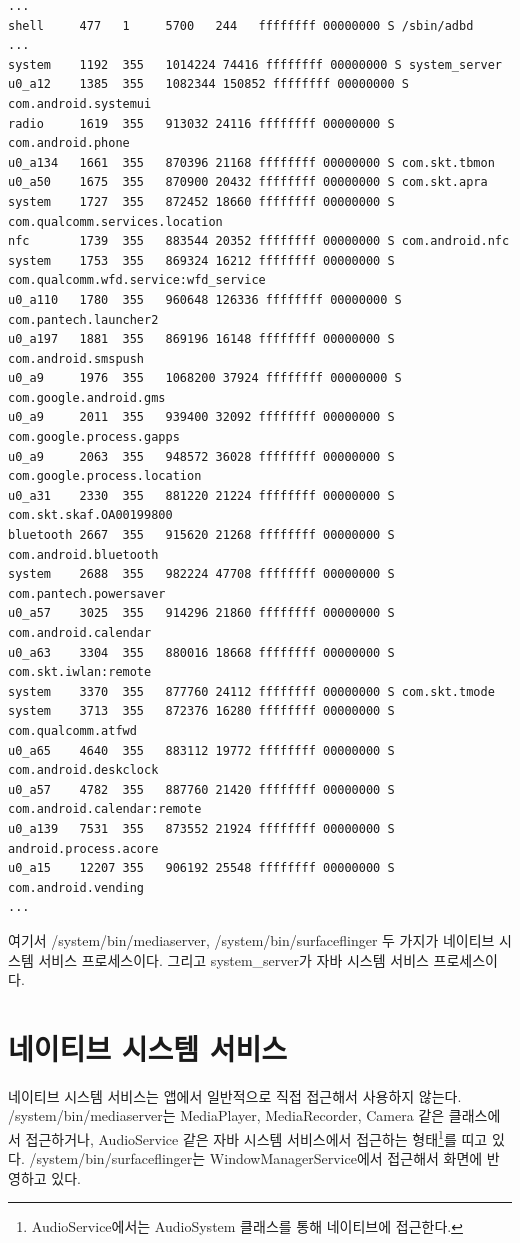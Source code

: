 \begin{lstlisting}[frame=single]
...
shell     477   1     5700   244   ffffffff 00000000 S /sbin/adbd
...
system    1192  355   1014224 74416 ffffffff 00000000 S system_server
u0_a12    1385  355   1082344 150852 ffffffff 00000000 S com.android.systemui
radio     1619  355   913032 24116 ffffffff 00000000 S com.android.phone
u0_a134   1661  355   870396 21168 ffffffff 00000000 S com.skt.tbmon
u0_a50    1675  355   870900 20432 ffffffff 00000000 S com.skt.apra
system    1727  355   872452 18660 ffffffff 00000000 S com.qualcomm.services.location
nfc       1739  355   883544 20352 ffffffff 00000000 S com.android.nfc
system    1753  355   869324 16212 ffffffff 00000000 S com.qualcomm.wfd.service:wfd_service
u0_a110   1780  355   960648 126336 ffffffff 00000000 S com.pantech.launcher2
u0_a197   1881  355   869196 16148 ffffffff 00000000 S com.android.smspush
u0_a9     1976  355   1068200 37924 ffffffff 00000000 S com.google.android.gms
u0_a9     2011  355   939400 32092 ffffffff 00000000 S com.google.process.gapps
u0_a9     2063  355   948572 36028 ffffffff 00000000 S com.google.process.location
u0_a31    2330  355   881220 21224 ffffffff 00000000 S com.skt.skaf.OA00199800
bluetooth 2667  355   915620 21268 ffffffff 00000000 S com.android.bluetooth
system    2688  355   982224 47708 ffffffff 00000000 S com.pantech.powersaver
u0_a57    3025  355   914296 21860 ffffffff 00000000 S com.android.calendar
u0_a63    3304  355   880016 18668 ffffffff 00000000 S com.skt.iwlan:remote
system    3370  355   877760 24112 ffffffff 00000000 S com.skt.tmode
system    3713  355   872376 16280 ffffffff 00000000 S com.qualcomm.atfwd
u0_a65    4640  355   883112 19772 ffffffff 00000000 S com.android.deskclock
u0_a57    4782  355   887760 21420 ffffffff 00000000 S com.android.calendar:remote
u0_a139   7531  355   873552 21924 ffffffff 00000000 S android.process.acore
u0_a15    12207 355   906192 25548 ffffffff 00000000 S com.android.vending
...
\end{lstlisting}

여기서 /system/bin/mediaserver, /system/bin/surfaceflinger 두 가지가 네이티브 시스템 서비스 프로세스이다. 그리고 system\_server가 자바 시스템 서비스 프로세스이다.

\section{네이티브 시스템 서비스}
네이티브 시스템 서비스는 앱에서 일반적으로 직접 접근해서 사용하지 않는다.
/system/bin/mediaserver는 MediaPlayer, MediaRecorder, Camera 같은 클래스에서 접근하거나, AudioService 같은 자바 시스템 서비스에서 접근하는 형태\footnote{AudioService에서는 AudioSystem 클래스를 통해 네이티브에 접근한다.}를 띠고 있다.
/system/bin/surfaceflinger는 WindowManagerService에서 접근해서 화면에 반영하고 있다.

